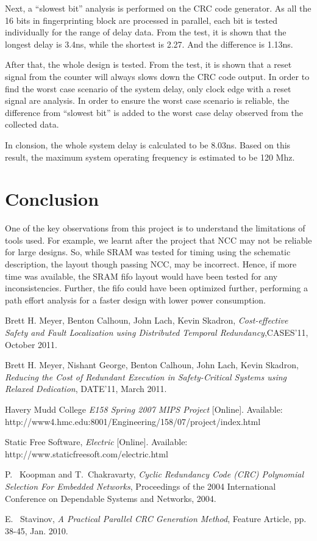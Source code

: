 \documentclass[10pt,journal,compsoc]{IEEEtran}
\begin{document}
Next, a “slowest bit” analysis is performed on the CRC code generator. As all the 16 bits in fingerprinting block are processed in parallel, each bit is tested individually for the range of delay data. From the test, it is shown that the longest delay is 3.4ns, while the shortest is 2.27. And the difference is 1.13ns.

After that, the whole design is tested. From the test, it is shown that a reset signal from the counter will always slows down the CRC code output. In order to find the worst case scenario of the system delay, only clock edge with a reset signal are analysis. In order to ensure the worst case scenario is reliable, the difference from “slowest bit” is added to the worst case delay observed from the collected data.

In clonsion, the whole system delay is calculated to be 8.03ns. Based on this result, the maximum system operating frequency is estimated to be 120 Mhz. 

\section{Conclusion}
One of the key observations from this project is to understand the limitations of tools used. For example, we learnt after the project that NCC may not be reliable for large designs. So, while SRAM was tested for timing using the schematic description, the layout though passing NCC, may be incorrect. Hence, if more time was available, the SRAM fifo layout would have been tested for any inconsistencies. Further, the fifo could have been optimized further, performing a path effort analysis for a faster design with lower power consumption. 




\begin{thebibliography}{1}


 Brett H. Meyer, Benton Calhoun, John Lach, Kevin Skadron, \emph{Cost-effective Safety and Fault Localization using Distributed Temporal Redundancy},CASES'11, October 2011.

Brett H. Meyer, Nishant George, Benton Calhoun, John Lach, Kevin Skadron, \emph{Reducing the Cost of Redundant Execution in Safety-Critical Systems using Relaxed Dedication}, DATE'11, March 2011.

Havery Mudd College \emph{E158 Spring 2007 MIPS Project} [Online]. Available: http://www4.hmc.edu:8001/Engineering/158/07/project/index.html

Static Free Software, \emph{Electric} [Online]. Available: http://www.staticfreesoft.com/electric.html

P. ~Koopman and T.~Chakravarty, \emph{Cyclic Redundancy Code ({CRC}) Polynomial Selection For Embedded Networks}, Proceedings of the 2004 International Conference on Dependable Systems and Networks, 2004.

E. ~Stavinov, \emph{A Practical Parallel {CRC} Generation Method}, Feature Article, pp. 38-45, Jan. 2010. 

\end{thebibliography}









\end{document}
